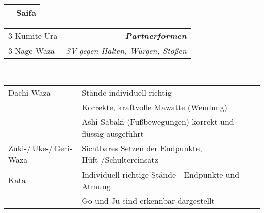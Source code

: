 \begin{tcolorbox}[width=\textwidth,height=\textheight,right=12pt,left=12pt,colframe=BLBELT,colback=white,fonttitle=\bfseries,coltitle=white,title=5. Kyu:\indent Kihon-Ido Kata - Partnerformen - Erwartungshorizont]
\begin{minipage}[t]{0.45\textwidth}
\begin{tabularx}{\textwidth}{cX}
			&Saifa \\
			\midrule
		\end{tabularx}
	\end{minipage}
	\null\hfill\null
	\begin{minipage}[t]{0.45\textwidth}
		\begin{tabularx}{\textwidth}{Xr}
			\midrule
			3 Kumite-Ura	&{\textbf{\textit{Partnerformen}}}\\
			3 Nage-Waza		&{\small \textit{SV gegen Halten, Würgen, Stoßen}} \\
			\midrule
		\end{tabularx}
	\end{minipage}\\
	\null\vfill\null
	{\small\begin{tabularx}{\textwidth}{ll}
		\midrule
		Dachi-Waza	&	Stände individuell richtig \\
		&	Korrekte, kraftvolle Mawatte (Wendung)\\
		&	Ashi-Sabaki (Fußbewegungen) korrekt und flüssig ausgeführt\\
		Zuki-/\,Uke-/\,Geri-Waza	&	Sichtbares Setzen der Endpunkte, Hüft-/Schultereinsatz\\
		Kata		&	Individuell richtige Stände - Endpunkte und Atmung\\
		&	G\={o} und J\={u} sind erkennbar dargestellt\\
		\midrule
	\end{tabularx}}\null\vfill\null
\end{tcolorbox}	